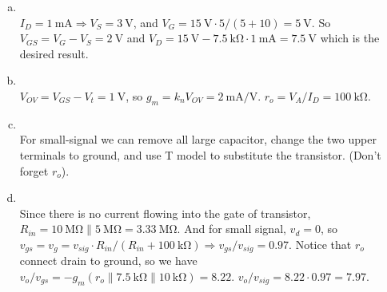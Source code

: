 \documentclass[12pt, a4paper]{article}
\begin{document}
\begin{enumerate}[(a)]
  \item \Ans \\
    $I_D = \SI{1}{\mA} \Rightarrow V_S = \SI{3}{\V}$, and $V_G = \SI{15}{\V}
    \cdot 5/(5+10) = \SI{5}{\V}$. So $V_{GS} = V_G - V_S = \SI{2}{\V}$ and
    $V_D = \SI{15}{\V} - \SI{7.5}{\kohm} \cdot \SI{1}{\mA} = \SI{7.5}{\V}$
    which is the desired result.
  \item \Ans \\
    $V_{OV} = V_{GS} - V_t = \SI{1}{\V}$, so $g_m = k_n V_{OV} = \SI{2}{\mA/\V}$.
    $r_o = V_A / I_D = \SI{100}{\kohm}$.
  \item \Ans \\
    For small-signal we can remove all large capacitor, change the two upper
    terminals to ground, and use T model to substitute the transistor.
    (Don't forget $r_o$).
  \item \Ans \\
    Since there is no current flowing into the gate of transistor, 
    $R_{in} = \SI{10}{\mega\ohm} \parallel \SI{5}{\mega\ohm} = \SI{3.33}{\mega\ohm}$.
    And for small signal, $v_d = 0$, so $v_{gs} = v_g = v_{sig} \cdot
    R_{in} / (R_{in} + \SI{100}{\kohm}) \Rightarrow v_{gs}/v_{sig} = 0.97$.
    Notice that $r_o$ connect drain to ground, so we have $v_o/v_{gs} =
    -g_m (r_o \parallel \SI{7.5}{\kohm} \parallel \SI{10}{\kohm}) = 8.22$.
    $v_o / v_{sig} = 8.22 \cdot 0.97 = 7.97$.
\end{enumerate}
\end{document}
